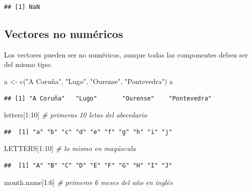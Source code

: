 \documentclass[
]{book}
\newenvironment{Shaded}{\begin{snugshade}}{\end{snugshade}}
\newcommand{\CommentTok}[1]{\textcolor[rgb]{0.56,0.35,0.01}{\textit{#1}}}
\newcommand{\DecValTok}[1]{\textcolor[rgb]{0.00,0.00,0.81}{#1}}
\newcommand{\FunctionTok}[1]{\textcolor[rgb]{0.00,0.00,0.00}{#1}}
\newcommand{\NormalTok}[1]{#1}
\newcommand{\OtherTok}[1]{\textcolor[rgb]{0.56,0.35,0.01}{#1}}
\newcommand{\SpecialCharTok}[1]{\textcolor[rgb]{0.00,0.00,0.00}{#1}}
\newcommand{\StringTok}[1]{\textcolor[rgb]{0.31,0.60,0.02}{#1}}
\theoremstyle{break}
\theoremstyle{nonumberplain}
\begin{document}
\begin{verbatim}
## [1] NaN
\end{verbatim}

\hypertarget{vectores-no-numuxe9ricos}{%
\subsection{Vectores no numéricos}\label{vectores-no-numuxe9ricos}}

Los vectores pueden ser no numéricos, aunque todas las componentes deben ser del mismo tipo:

\begin{Shaded}
\begin{Highlighting}[]
\NormalTok{a }\OtherTok{\textless{}{-}} \FunctionTok{c}\NormalTok{(}\StringTok{"A Coruña"}\NormalTok{, }\StringTok{"Lugo"}\NormalTok{, }\StringTok{"Ourense"}\NormalTok{, }\StringTok{"Pontevedra"}\NormalTok{)}
\NormalTok{a}
\end{Highlighting}
\end{Shaded}

\begin{verbatim}
## [1] "A Coruña"   "Lugo"       "Ourense"    "Pontevedra"
\end{verbatim}

\begin{Shaded}
\begin{Highlighting}[]
\NormalTok{letters[}\DecValTok{1}\SpecialCharTok{:}\DecValTok{10}\NormalTok{]  }\CommentTok{\# primeras 10 letas del abecedario}
\end{Highlighting}
\end{Shaded}

\begin{verbatim}
##  [1] "a" "b" "c" "d" "e" "f" "g" "h" "i" "j"
\end{verbatim}

\begin{Shaded}
\begin{Highlighting}[]
\NormalTok{LETTERS[}\DecValTok{1}\SpecialCharTok{:}\DecValTok{10}\NormalTok{]  }\CommentTok{\# lo mismo en mayúscula}
\end{Highlighting}
\end{Shaded}

\begin{verbatim}
##  [1] "A" "B" "C" "D" "E" "F" "G" "H" "I" "J"
\end{verbatim}

\begin{Shaded}
\begin{Highlighting}[]
\NormalTok{month.name[}\DecValTok{1}\SpecialCharTok{:}\DecValTok{6}\NormalTok{]  }\CommentTok{\# primeros 6 meses del año en inglés}
\end{Highlighting}
\end{Shaded}
\end{document}

